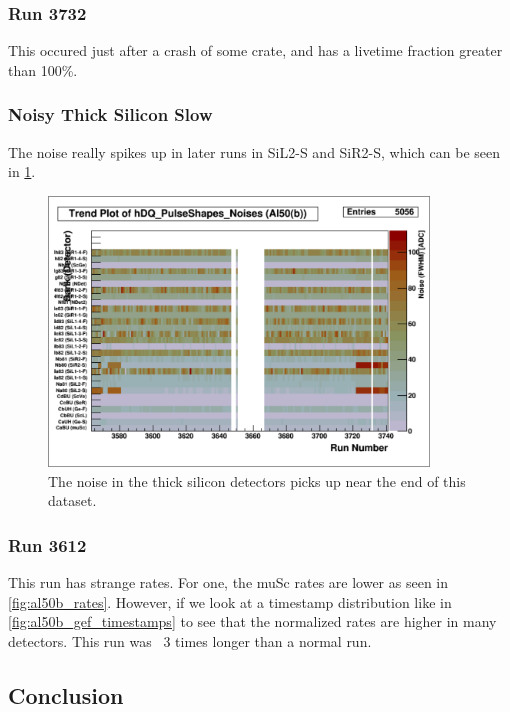 \documentclass[a4paper]{article}
\begin{document}
\subsubsection{Run 3732}

This occured just after a crash of some crate, and has a livetime fraction
greater than 100\%.


\subsubsection{Noisy Thick Silicon Slow}

The noise really spikes up in later runs in SiL2-S and SiR2-S, which can be seen in \ref{fig:al50b_noise}.

\begin{figure}
  \centering
  \includegraphics[width=0.9\textwidth]{figs/al50b/noise}
  \caption{The noise in the thick silicon detectors picks up near the end of this dataset.}
  \label{fig:al50b_noise}
\end{figure}


\subsubsection{Run 3612}

This run has strange rates. For one, the muSc rates are lower as seen in \ref{fig:al50b_rates}.
However, if we look at a timestamp distribution like in \ref{fig:al50b_gef_timestamps} to
see that the normalized rates are higher in many detectors. This run was ~3 times longer
than a normal run.


\subsection{Conclusion}
\end{document}
